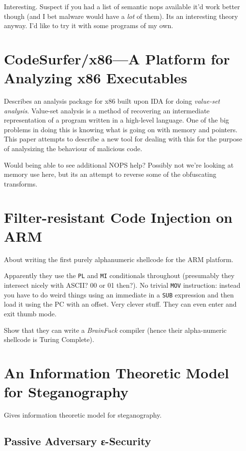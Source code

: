Interesting. Suspect if you had a list of semantic nops available it'd
work better though (and I bet malware would have a \emph{lot} of them).
Its an interesting theory anyway. I'd like to try it with some programs
of my own.

\section{CodeSurfer/x86---A Platform for Analyzing x86
Executables\citep{Balakrishnan2005}}

Describes an analysis package for x86 built upon IDA for doing
\emph{value-set analysis}. Value-set analysis is a method of recovering
an intermediate representation of a program written in a high-level
language. One of the big problems in doing this is knowing what is going
on with memory and pointers. This paper attempts to describe a new tool
for dealing with this for the purpose of analysizing the behaviour of
malicious code.

Would being able to see additional NOPS help? Possibly not we're looking
at memory use here, but its an attempt to reverse some of the
obfuscating transforms.

\section{Filter-resistant Code Injection on ARM\citep{Younan2009}}

About writing the first purely alphanumeric shellcode for the ARM
platform.

Apparently they use the \texttt{PL} and \texttt{MI} conditionals
throughout (presumably they intersect nicely with ASCII? 00 or 01
then?). No trivial \texttt{MOV} instruction: instead you have to do
weird things using an immediate in a \texttt{SUB} expression and then
load it using the PC with an offset. Very clever stuff. They can even
enter and exit thumb mode.

Show that they can write a \emph{BrainFuck} compiler (hence their
alpha-numeric shellcode is Turing Complete).

\section{An Information Theoretic Model for
Steganography\citep{Cachin1998}}

Gives information theoretic model for steganography.

\subsection{Passive Adversary ε-Security}

